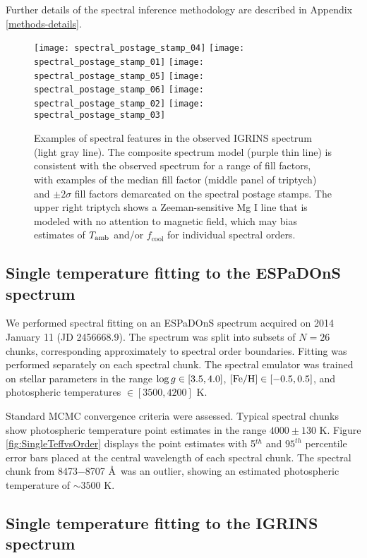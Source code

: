 \documentclass[twocolumn]{emulateapj}%
\begin{document}
Further details of the spectral inference methodology are described in Appendix \ref{methods-details}.


\begin{figure*}
 \centering
 \texttt{[image: spectral\_postage\_stamp\_04]} 
 \texttt{[image: spectral\_postage\_stamp\_01]} 
 \texttt{[image: spectral\_postage\_stamp\_05]} 
 \texttt{[image: spectral\_postage\_stamp\_06]} 
 \texttt{[image: spectral\_postage\_stamp\_02]} 
 \texttt{[image: spectral\_postage\_stamp\_03]} 
 \caption{Examples of spectral features in the observed IGRINS spectrum (light gray line).  The composite spectrum model (purple thin line) is consistent with the observed spectrum for a range of fill factors, with examples of the median fill factor (middle panel of triptych) and $\pm2\sigma$ fill factors demarcated on the spectral postage stamps.  The upper right triptych shows a Zeeman-sensitive Mg I line that is modeled with no attention to magnetic field, which may bias estimates of $T_\textrm{amb}$ and/or $f_{\mathrm{cool}}$ for individual spectral orders.}
 \label{fig:specPostageStamp}
\end{figure*}

\subsection{Single temperature fitting to the ESPaDOnS spectrum}\label{sec:ESP_starfish}

We performed spectral fitting on an ESPaDOnS spectrum acquired on 2014 January 11 (JD 2456668.9).  The spectrum was split into subsets of $N=26$ chunks, corresponding approximately to spectral order boundaries.  Fitting was performed separately on each spectral chunk.  The spectral emulator was trained on stellar parameters in the range $\log g \in [3.5, 4.0]$, $[{\rm Fe}/{\rm H}] \in [-0.5, 0.5]$, and photospheric temperatures $\in [3500, 4200]$ K.

Standard MCMC convergence criteria were assessed.  Typical spectral chunks show photospheric temperature point estimates in the range $4000\pm130$ K.  Figure \ref{fig:SingleTeffvsOrder} displays the point estimates with 5$^{th}$ and $95^{th}$ percentile error bars placed at the central wavelength of each spectral chunk.  The spectral chunk from 8473$-$8707 \AA\ was an outlier, showing an estimated photospheric temperature of $\sim3500$ K.

\subsection{Single temperature fitting to the IGRINS spectrum}\label{sec:IGR_starfish}
\end{document}
